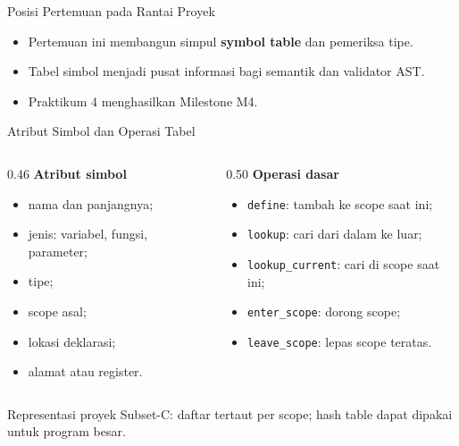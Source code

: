 \documentclass[aspectratio=169,10pt,t]{beamer}
\begin{document}
\begin{frame}{Posisi Pertemuan pada Rantai Proyek}

  \vspace{2pt}
  \begin{itemize}
    \item Pertemuan ini membangun simpul \textbf{symbol table} dan
          pemeriksa tipe.
    \item Tabel simbol menjadi pusat informasi bagi semantik dan
          validator AST.
    \item Praktikum 4 menghasilkan Milestone M4.
  \end{itemize}
\end{frame}

\begin{frame}{Atribut Simbol dan Operasi Tabel}
  \begin{columns}[T,onlytextwidth]
    \begin{column}{0.46\textwidth}
      \textbf{Atribut simbol}
      \begin{itemize}
        \item nama dan panjangnya;
        \item jenis: variabel, fungsi, parameter;
        \item tipe;
        \item scope asal;
        \item lokasi deklarasi;
        \item alamat atau register.
      \end{itemize}
    \end{column}
    \begin{column}{0.50\textwidth}
      \textbf{Operasi dasar}
      \begin{itemize}
        \item \texttt{define}: tambah ke scope saat ini;
        \item \texttt{lookup}: cari dari dalam ke luar;
        \item \texttt{lookup\_current}: cari di scope saat ini;
        \item \texttt{enter\_scope}: dorong scope;
        \item \texttt{leave\_scope}: lepas scope teratas.
      \end{itemize}
    \end{column}
  \end{columns}

  \vspace{4pt}
  {\footnotesize\color{ubbblue!80}Representasi proyek Subset-C:
  daftar tertaut per scope; hash table dapat dipakai untuk program
  besar.}
\end{frame}
\end{document}
